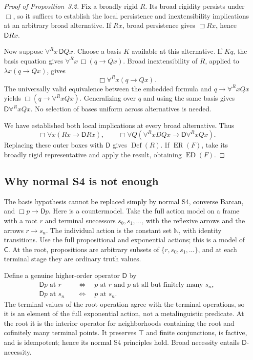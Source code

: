 \documentclass[11pt]{article}
\theoremstyle{definition}
\newcommand{\D}{\mathsf D}
\newcommand{\ED}{\operatorname{ED}}
\newcommand{\Def}{\operatorname{Def}}
\newcommand{\ER}{\operatorname{ER}}
\newcommand{\C}{\mathsf C}
\numberwithin{equation}{section}
\begin{document}
\begin{proof}[Proof of Proposition~3.2]
Fix a broadly rigid $R$. Its broad rigidity persists under $\Box$, so it suffices to establish the local persistence and inextensibility implications at an arbitrary broad alternative. If $Rx$, broad persistence gives $\Box Rx$, hence $\D Rx$.

Now suppose $\forall^R x\,\D Qx$. Choose a basis $K$ available at this alternative. If $Kq$, the basis equation gives $\forall^R x\,\Box(q\rightarrow Qx)$. Broad inextensibility of $R$, applied to $\lambda x(q\rightarrow Qx)$, gives
$$
\Box\forall^R x(q\rightarrow Qx).
$$
The universally valid equivalence between the embedded formula and $q\rightarrow\forall^R xQx$ yields $\Box(q\rightarrow\forall^R xQx)$. Generalizing over $q$ and using the same basis gives $\D \forall^R xQx$. No selection of bases uniform across alternatives is needed.

We have established both local implications at every broad alternative. Thus
$$
\Box\forall x(Rx\rightarrow \D Rx),\qquad
\Box\forall Q(\forall^R xDQx\rightarrow \D \forall^R xQx).
$$
Replacing these outer boxes with $\D $ gives $\Def(R)$. If $\ER(F)$, take its broadly rigid representative and apply the result, obtaining $\ED(F)$.
\end{proof}

\subsection{Why normal S4 is not enough}\label{subsec:neighborhood}

The basis hypothesis cannot be replaced simply by normal S4, converse Barcan, and $\Box p\rightarrow \D p$. Here is a countermodel. Take the full action model on a frame with a root $r$ and terminal successors $s_0,s_1,\ldots$, with the reflexive arrows and the arrows $r\to s_n$. The individual action is the constant set $\mathbb N$, with identity transitions. Use the full propositional and exponential actions; this is a model of $\C$. At the root, propositions are arbitrary subsets of $\{r,s_0,s_1,\ldots\}$, and at each terminal stage they are ordinary truth values.

Define a genuine higher-order operator $\D $ by
$$
\begin{aligned}
\D  p\text{ at }r
&\quad\Longleftrightarrow\quad
p\text{ at }r\text{ and }p\text{ at all but finitely many }s_n,\\
\D  p\text{ at }s_n
&\quad\Longleftrightarrow\quad p\text{ at }s_n.
\end{aligned}
$$
The terminal values of the root operation agree with the terminal operations, so it is an element of the full exponential action, not a metalinguistic predicate. At the root it is the interior operator for neighborhoods containing the root and cofinitely many terminal points. It preserves $\top$ and finite conjunctions, is factive, and is idempotent; hence its normal S4 principles hold. Broad necessity entails $\D $-necessity.
\end{document}
